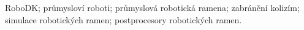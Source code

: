 ﻿%
RoboDK; průmysloví roboti; průmyslová robotická ramena; zabránění kolizím; simulace robotických ramen; postprocesory robotických ramen.



